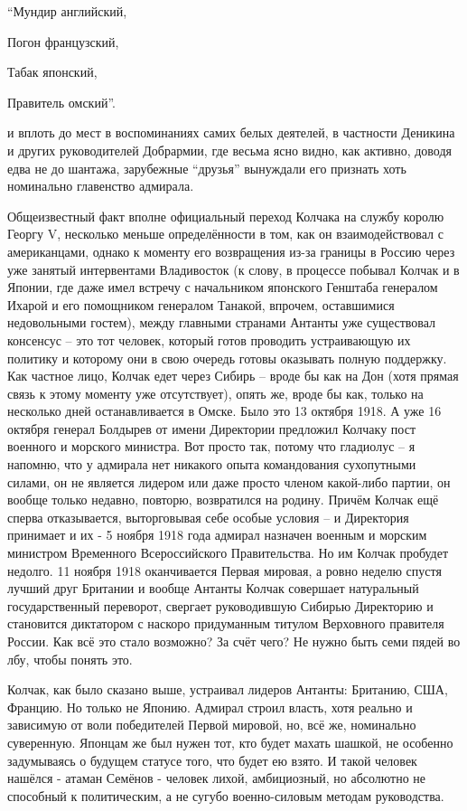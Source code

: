 “Мундир английский,

Погон французский,

Табак японский,

Правитель омский”.

и вплоть до мест в воспоминаниях самих белых деятелей, в частности Деникина и других руководителей Добрармии, где весьма ясно видно, как активно, доводя едва не до шантажа, зарубежные “друзья” вынуждали его признать хоть номинально главенство адмирала.

Общеизвестный факт вполне официальный переход Колчака на службу королю Георгу V, несколько меньше определённости в том, как он взаимодействовал с американцами, однако к моменту его возвращения из-за границы в Россию через уже занятый интервентами Владивосток (к слову, в процессе побывал Колчак и в Японии, где даже имел встречу с начальником японского Генштаба генералом Ихарой и его помощником генералом Танакой, впрочем, оставшимися недовольными гостем), между главными странами Антанты уже существовал консенсус – это тот человек, который готов проводить устраивающую их политику и которому они в свою очередь готовы оказывать полную поддержку. Как частное лицо, Колчак едет через Сибирь – вроде бы как на Дон (хотя прямая связь к этому моменту уже отсутствует), опять же, вроде бы как, только на несколько дней останавливается в Омске. Было это 13 октября 1918. А уже 16 октября генерал Болдырев от имени Директории предложил Колчаку пост военного и морского министра. Вот просто так, потому что гладиолус – я напомню, что у адмирала нет никакого опыта командования сухопутными силами, он не является лидером или даже просто членом какой-либо партии, он вообще только недавно, повторю, возвратился на родину. Причём Колчак ещё сперва отказывается, выторговывая себе особые условия – и Директория принимает и их - 5 ноября 1918 года адмирал назначен военным и морским министром Временного Всероссийского Правительства. Но им Колчак пробудет недолго. 11 ноября 1918 оканчивается Первая мировая, а ровно неделю спустя лучший друг Британии и вообще Антанты Колчак совершает натуральный государственный переворот, свергает руководившую Сибирью Директорию и становится диктатором с наскоро придуманным титулом Верховного правителя России. Как всё это стало возможно? За счёт чего? Не нужно быть семи пядей во лбу, чтобы понять это.

Колчак, как было сказано выше, устраивал лидеров Антанты: Британию, США, Францию. Но только не Японию. Адмирал строил власть, хотя реально и зависимую от воли победителей Первой мировой, но, всё же, номинально суверенную. Японцам же был нужен тот, кто будет махать шашкой, не особенно задумываясь о будущем статусе того, что будет ею взято. И такой человек нашёлся - атаман Семёнов - человек лихой, амбициозный, но абсолютно не способный к политическим, а не сугубо военно-силовым методам руководства.

